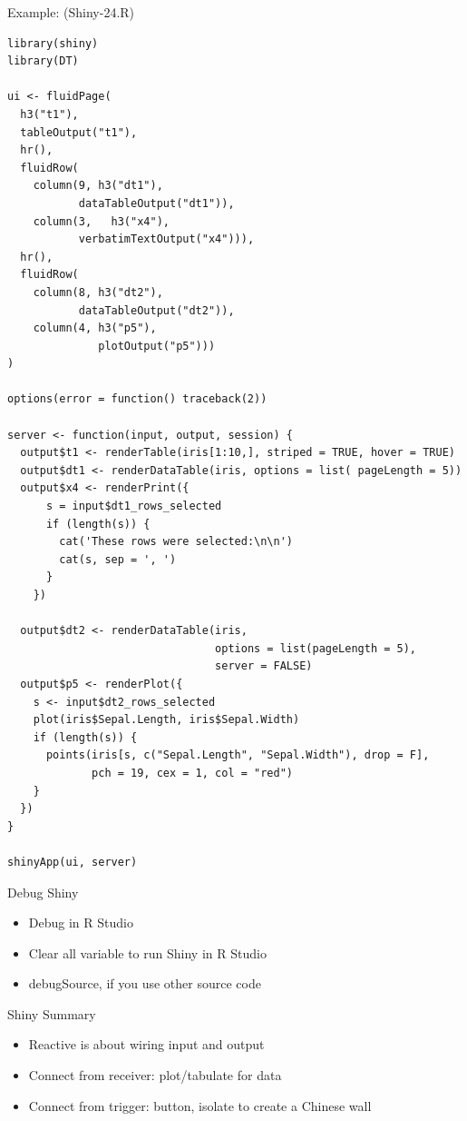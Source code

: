 \documentclass[
  10pt,
  ignorenonframetext,
  serif]{beamer}
\providecommand{\tightlist}{%
  \setlength{\itemsep}{0pt}\setlength{\parskip}{0pt}}
\begin{document}
\begin{frame}[fragile]{Example: (Shiny-24.R)}
\protect\hypertarget{example-shiny-24.r}{}
\begin{verbatim}
library(shiny)
library(DT)

ui <- fluidPage(
  h3("t1"),
  tableOutput("t1"),
  hr(),
  fluidRow(
    column(9, h3("dt1"),
           dataTableOutput("dt1")),
    column(3,   h3("x4"),
           verbatimTextOutput("x4"))),
  hr(),
  fluidRow(
    column(8, h3("dt2"),
           dataTableOutput("dt2")),
    column(4, h3("p5"),
              plotOutput("p5")))
)

options(error = function() traceback(2))

server <- function(input, output, session) {
  output$t1 <- renderTable(iris[1:10,], striped = TRUE, hover = TRUE)
  output$dt1 <- renderDataTable(iris, options = list( pageLength = 5))
  output$x4 <- renderPrint({
      s = input$dt1_rows_selected
      if (length(s)) {
        cat('These rows were selected:\n\n')
        cat(s, sep = ', ')
      }
    })    
    
  output$dt2 <- renderDataTable(iris,
                                options = list(pageLength = 5),
                                server = FALSE)
  output$p5 <- renderPlot({
    s <- input$dt2_rows_selected
    plot(iris$Sepal.Length, iris$Sepal.Width)
    if (length(s)) {
      points(iris[s, c("Sepal.Length", "Sepal.Width"), drop = F],
             pch = 19, cex = 1, col = "red") 
    }
  })
}

shinyApp(ui, server)
\end{verbatim}
\end{frame}

\begin{frame}{Debug Shiny}
\protect\hypertarget{debug-shiny}{}
\begin{itemize}
\tightlist
\item
  Debug in R Studio
\item
  Clear all variable to run Shiny in R Studio
\item
  debugSource, if you use other source code
\end{itemize}
\end{frame}

\begin{frame}{Shiny Summary}
\protect\hypertarget{shiny-summary}{}
\begin{itemize}
\tightlist
\item
  Reactive is about wiring input and output
\item
  Connect from receiver: plot/tabulate for data
\item
  Connect from trigger: button, isolate to create a Chinese wall
\end{itemize}
\end{frame}
\end{document}
